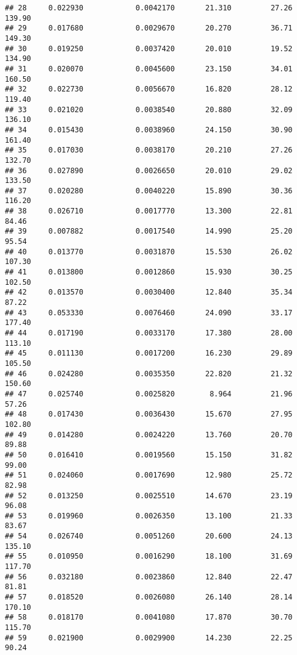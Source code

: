 \documentclass[
]{article}
\begin{document}
\begin{verbatim}
## 28     0.022930            0.0042170       21.310         27.26          139.90
## 29     0.017680            0.0029670       20.270         36.71          149.30
## 30     0.019250            0.0037420       20.010         19.52          134.90
## 31     0.020070            0.0045600       23.150         34.01          160.50
## 32     0.022730            0.0056670       16.820         28.12          119.40
## 33     0.021020            0.0038540       20.880         32.09          136.10
## 34     0.015430            0.0038960       24.150         30.90          161.40
## 35     0.017030            0.0038170       20.210         27.26          132.70
## 36     0.027890            0.0026650       20.010         29.02          133.50
## 37     0.020280            0.0040220       15.890         30.36          116.20
## 38     0.026710            0.0017770       13.300         22.81           84.46
## 39     0.007882            0.0017540       14.990         25.20           95.54
## 40     0.013770            0.0031870       15.530         26.02          107.30
## 41     0.013800            0.0012860       15.930         30.25          102.50
## 42     0.013570            0.0030400       12.840         35.34           87.22
## 43     0.053330            0.0076460       24.090         33.17          177.40
## 44     0.017190            0.0033170       17.380         28.00          113.10
## 45     0.011130            0.0017200       16.230         29.89          105.50
## 46     0.024280            0.0035350       22.820         21.32          150.60
## 47     0.025740            0.0025820        8.964         21.96           57.26
## 48     0.017430            0.0036430       15.670         27.95          102.80
## 49     0.014280            0.0024220       13.760         20.70           89.88
## 50     0.016410            0.0019560       15.150         31.82           99.00
## 51     0.024060            0.0017690       12.980         25.72           82.98
## 52     0.013250            0.0025510       14.670         23.19           96.08
## 53     0.019960            0.0026350       13.100         21.33           83.67
## 54     0.026740            0.0051260       20.600         24.13          135.10
## 55     0.010950            0.0016290       18.100         31.69          117.70
## 56     0.032180            0.0023860       12.840         22.47           81.81
## 57     0.018520            0.0026080       26.140         28.14          170.10
## 58     0.018170            0.0041080       17.870         30.70          115.70
## 59     0.021900            0.0029900       14.230         22.25           90.24

\end{verbatim}
\end{document}
